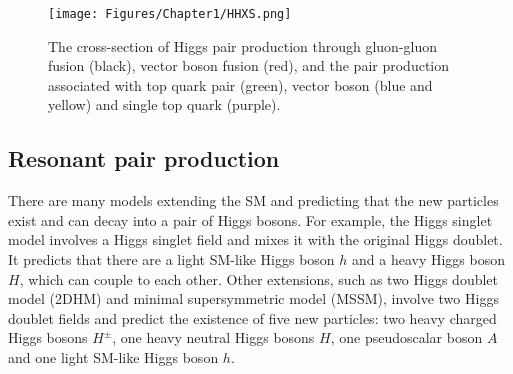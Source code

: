 
\begin{figure}[h]
  \centering
  \texttt{[image: Figures/Chapter1/HHXS.png]}
  \caption{The cross-section of Higgs pair production through gluon-gluon fusion (black), vector boson fusion (red), and the pair production associated with top quark pair (green), vector boson (blue and yellow) and single top quark (purple).~\cite{1401.7340}}
  \label{fig:HHXS}
\end{figure}

\subsection{Resonant pair production}

There are many models extending the SM and predicting that the new particles exist and can decay into a pair of Higgs bosons.
For example, the Higgs singlet model involves a Higgs singlet field and mixes it with the original Higgs doublet.
It predicts that there are a light SM-like Higgs boson $h$ and a heavy Higgs boson $H$, which can couple to each other.
Other extensions, such as two Higgs doublet model (2DHM) and minimal supersymmetric model (MSSM), involve two Higgs doublet fields and predict the existence of five new particles: two heavy charged Higgs bosons $H^{\pm}$, one heavy neutral Higgs bosons $H$, one pseudoscalar boson $A$ and one light SM-like Higgs boson $h$.

